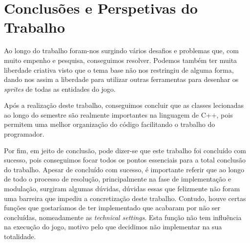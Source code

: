 \documentclass[a4paper,11pt]{article}
\newcommand\tab[1][0.8cm]{\hspace*{#1}}
\begin{document}
\pagebreak


\section{Conclusões e Perspetivas do Trabalho}

\tab Ao longo do trabalho foram-nos surgindo vários desafios e problemas que, com muito empenho e pesquisa, conseguimos resolver. Podemos também ter muita liberdade criativa visto que o tema base não nos restringiu de alguma forma, dando nos assim a liberdade para utilizar outras ferramentas para desenhar os \textit{sprites} de todas as entidades do jogo. \tab

Após a realização deste trabalho, conseguimos concluir que as classes lecionadas ao longo do semestre são realmente importantes na linguagem de C++, pois permitem uma melhor organização do código facilitando o trabalho do programador.\tab

Por fim, em jeito de conclusão, pode dizer-se que este trabalho foi concluído com sucesso, pois conseguimos focar todos os pontos essenciais para a total conclusão do trabalho. Apesar de concluído com sucesso, é importante referir que ao longo de todo o processo de resolução, principalmente na fase de implementação e modulação, surgiram algumas dúvidas, dúvidas essas que felizmente não foram uma barreira que impediu a concretização deste trabalho. Contudo, houve certas funções que gostaríamos de ter implementado que acabaram por não ser concluídas, nomeadamente as \textit{technical settings}. Esta função não tem influência na execução do jogo, motivo pelo que decidimos não implementar na sua totalidade.

\pagebreak

\appendix

\printbibliography[title={Referências Bibliográficas}]


\pagebreak
\end{document}
